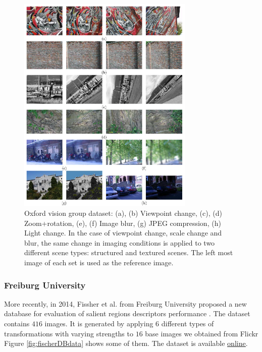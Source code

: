 \begin{figure}[H]
\begin{center}
\includegraphics[width=0.75\textwidth]{fig/MikDataset}
\end{center}
\caption{Oxford vision group dataset: (a), (b) Viewpoint change, (c), (d) Zoom+rotation, (e), (f) Image blur, (g) JPEG compression, (h) Light change. In the
case of viewpoint change, scale change and blur, the same change in imaging conditions is applied to two different scene types: structured and
textured scenes. The left most image of each set is used as the reference image.}
\label{fig:mikdataset}
\end{figure}


\subsubsection{Freiburg University}
More recently, in 2014, Fissher et al. from Freiburg University  proposed a new database for evaluation of salient regions descriptors performance \cite{FischerDB14}. 
The dataset contains $416$ images. It is generated by applying $6$ different types of transformations with varying strengths to $16$ base images we obtained from Flickr
Figure \ref{fig:fischerDBdata} shows some of them. The dataset is available \href{http://lmb.informatik.uni-freiburg.de/resources/datasets/genmatch.en.html}{\underline{online}}.

